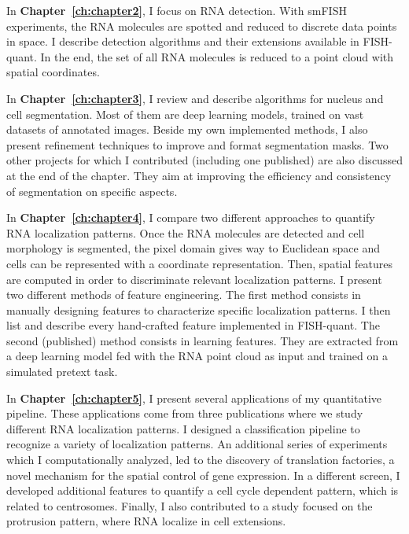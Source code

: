 In \textbf{Chapter~\ref{ch:chapter2}}, I focus on \ac{RNA} detection.
With \ac{smFISH} experiments, the \ac{RNA} molecules are spotted and reduced to discrete data points in space.
I describe detection algorithms and their extensions available in FISH-quant.
In the end, the set of all \ac{RNA} molecules is reduced to a point cloud with spatial coordinates.

In \textbf{Chapter~\ref{ch:chapter3}}, I review and describe algorithms for nucleus and cell segmentation.
Most of them are deep learning models, trained on vast datasets of annotated images.
Beside my own implemented methods, I also present refinement techniques to improve and format segmentation masks.
Two other projects for which I contributed (including one published) are also discussed at the end of the chapter.
They aim at improving the efficiency and consistency of segmentation on specific aspects.

In \textbf{Chapter~\ref{ch:chapter4}}, I compare two different approaches to quantify \ac{RNA} localization patterns.
Once the \ac{RNA} molecules are detected and cell morphology is segmented, the pixel domain gives way to Euclidean space and cells can be represented with a coordinate representation.
Then, spatial features are computed in order to discriminate relevant localization patterns.
I present two different methods of feature engineering.
The first method consists in manually designing features to characterize specific localization patterns.
I then list and describe every hand-crafted feature implemented in FISH-quant.
The second (published) method consists in learning features.
They are extracted from a deep learning model fed with the \ac{RNA} point cloud as input and trained on a simulated pretext task.

In \textbf{Chapter~\ref{ch:chapter5}}, I present several applications of my quantitative pipeline.
These applications come from three publications where we study different \ac{RNA} localization patterns.
I designed a classification pipeline to recognize a variety of localization patterns.
An additional series of experiments which I computationally analyzed, led to the discovery of translation factories, a novel mechanism for the spatial control of gene expression. 
In a different screen, I developed additional features to quantify a cell cycle dependent pattern, which is related to centrosomes.
Finally, I also contributed to a study focused on the protrusion pattern, where RNA localize in cell extensions.
